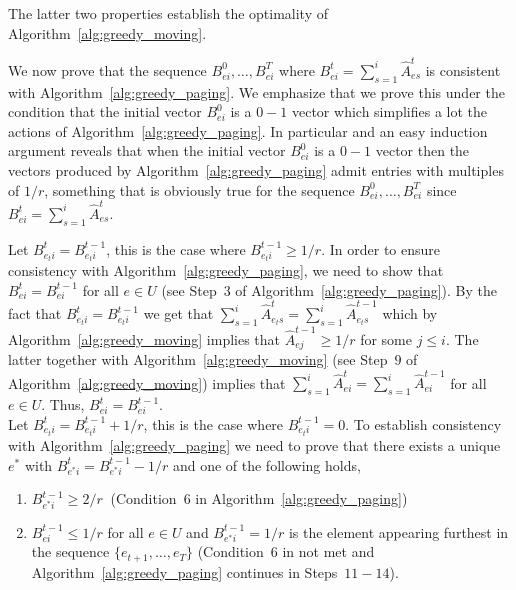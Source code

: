 \noindent The latter two properties establish the optimality of Algorithm~\ref{alg:greedy_moving}.
\smallskip


\noindent We now prove that the sequence $B_{ei}^0, \ldots,B_{ei}^T$ where $B_{ei}^t = \sum_{s=1}^i \hat{A}_{es}^t$ is consistent with Algorithm~\ref{alg:greedy_paging}. We emphasize that we prove this under the condition that the initial vector $B_{ei}^0$ is a $0-1$ vector which simplifies a lot the actions of Algorithm~\ref{alg:greedy_paging}. In particular and an easy induction argument reveals that when the initial vector $B_{ei}^0$ is a $0-1$ vector then the vectors produced by Algorithm~\ref{alg:greedy_paging} admit entries with multiples of $1/r$, something that is obviously true for the sequence $B_{ei}^0, \ldots,B_{ei}^T$ since $B_{ei}^t = \sum_{s=1}^i \hat{A}_{es}^t$.

Let $B_{e_t i}^t = B_{e_t i}^{t-1}$, this is the case where $B_{e_t i}^{t-1} \geq 1/r$. In order to ensure consistency with Algorithm~\ref{alg:greedy_paging}, we need to show that $B_{ei}^t =  B_{ei}^{t-1}$ for all $e \in U$ (see Step~$3$ of Algorithm~\ref{alg:greedy_paging}). By the fact that $B_{e_t i}^t =  B_{e_t i}^{t-1}$ we get that
$\sum_{s=1}^i \hat{A}_{e_t s}^t = \sum_{s=1}^i \hat{A}_{e_t s}^{t-1}$ which by Algorithm~\ref{alg:greedy_moving} implies that $\hat{A}_{ej}^{t-1} \geq 1/r$ for some $j \leq i$. The latter together with Algorithm~\ref{alg:greedy_moving} (see Step~$9$ of Algorithm~\ref{alg:greedy_moving}) implies that $\sum_{s=1}^i \hat{A}_{ei}^t =  \sum_{s=1}^i \hat{A}_{ei}^{t-1}$ for all $e \in U$. Thus, $B_{ei}^t =  B_{ei}^{t-1}$.\\

\noindent Let $B_{e_t i}^t = B_{e_t i}^{t-1} + 1/r$, this is the case where $B_{e_t i}^{t-1}=0$. To establish consistency with Algorithm~\ref{alg:greedy_paging} we need to prove that there exists a unique $e^\ast$ with $B_{e^\ast i}^t =  B_{e^\ast i}^{t-1} - 1/r$ and one of the following holds,
\begin{enumerate}
    \item $B_{e^\ast i}^{t-1} \geq 2/r~$ (Condition~$6$ in Algorithm~\ref{alg:greedy_paging})
    
    \item $B_{ei}^{t-1} \leq 1/r$ for all $e \in U$ and $B_{e^\ast i}^{t-1} = 1/r$ is the element appearing furthest in the sequence $\{e_{t+1},\ldots,e_T\}$
    (Condition~$6$ in not met and Algorithm~\ref{alg:greedy_paging} continues in Steps~$11-14$).
\end{enumerate}



